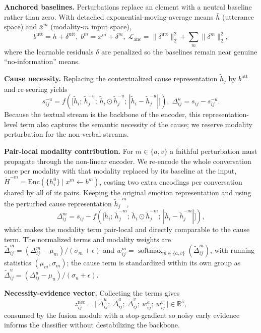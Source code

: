 \documentclass[journal]{IEEEtran}
\newcommand{\Real}{\mathbb{R}}
\newcommand{\Enc}{\mathrm{Enc}}
\begin{document}
\noindent\textbf{Anchored baselines.} Perturbations replace an element with a neutral
baseline rather than zero. With detached exponential-moving-average means $\bar h$
(utterance space) and $\bar x^{m}$ (modality-$m$ input space),
\begin{equation}
b^{\mathrm{utt}}=\bar h+\delta^{\mathrm{utt}},\;
b^{m}=\bar x^{m}+\delta^{m},\;
\mathcal{L}_{\mathrm{anc}}=\|\delta^{\mathrm{utt}}\|_2^2+\textstyle\sum_{m}\|\delta^{m}\|_2^2,
\end{equation}
where the learnable residuals $\delta$ are penalized so the baselines remain near genuine
``no-information'' means.

\noindent\textbf{Cause necessity.} Replacing the contextualized cause representation
$\tilde h_j$ by $b^{\mathrm{utt}}$ and re-scoring yields
\begin{equation}
s_{ij}^{-u}=f\!\left(\big[\tilde h_i;\,\tilde h_j^{-u};\,\tilde h_i\odot\tilde h_j^{-u};\,|\tilde h_i-\tilde h_j^{-u}|\big]\right),\;
\Delta_{ij}^{u}=s_{ij}-s_{ij}^{-u}.
\end{equation}
Because the textual stream is the backbone of the encoder, this representation-level term
also captures the semantic necessity of the cause; we reserve modality perturbation for the
non-verbal streams.

\noindent\textbf{Pair-local modality contribution.} For $m\in\{a,v\}$ a faithful
perturbation must propagate through the non-linear encoder. We re-encode the whole
conversation once per modality with that modality replaced by its baseline at the input,
$\tilde H^{-m}=\Enc(\{h_i^{0}\}\mid x^{m}\!\leftarrow b^{m})$, costing two extra encodings
per conversation shared by all of its pairs. Keeping the original emotion representation and
using the perturbed cause representation $\tilde h_j^{-m}$,
\begin{equation}
\Delta_{ij}^{m}=s_{ij}-f\!\left(\big[\tilde h_i;\,\tilde h_j^{-m};\,\tilde h_i\odot\tilde h_j^{-m};\,|\tilde h_i-\tilde h_j^{-m}|\big]\right),
\end{equation}
which makes the modality term pair-local and directly comparable to the cause term. The
normalized terms and modality weights are
$\tilde\Delta_{ij}^{m}=(\Delta_{ij}^{m}-\mu_m)/(\sigma_m+\epsilon)$ and
$w_{ij}^{m}=\operatorname{softmax}_{m\in\{a,v\}}(\tilde\Delta_{ij}^{m})$, with running
statistics $(\mu_m,\sigma_m)$; the cause term is standardized within its own group as
$\tilde\Delta_{ij}^{u}=(\Delta_{ij}^{u}-\mu_u)/(\sigma_u+\epsilon)$.

\noindent\textbf{Necessity-evidence vector.} Collecting the terms gives
\begin{equation}
z_{ij}^{\mathrm{nec}}=\big[\,\tilde\Delta_{ij}^{u};\ \tilde\Delta_{ij}^{a};\ \tilde\Delta_{ij}^{v};\ w_{ij}^{a};\ w_{ij}^{v}\,\big]\in\Real^{5},
\end{equation}
consumed by the fusion module with a stop-gradient so noisy early evidence informs the
classifier without destabilizing the backbone.
\end{document}
